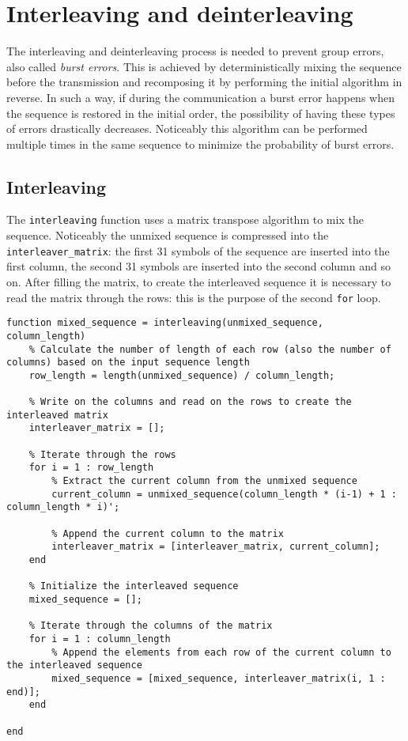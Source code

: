 \vspace{40px} \section{Interleaving and deinterleaving} \label{interleaving-process}
The interleaving and deinterleaving process is needed to prevent group errors, also called \textsl{burst errors}. This is achieved by deterministically mixing the sequence before the transmission and recomposing it by performing the initial algorithm in reverse. In such a way, if during the communication a burst error happens when the sequence is restored in the initial order, the possibility of having these types of errors drastically decreases. Noticeably this algorithm can be performed multiple times in the same sequence to minimize the probability of burst errors.


\subsection{Interleaving}\label{interleaving}
The \texttt{interleaving} function uses a matrix transpose algorithm to mix the sequence. Noticeably the unmixed sequence is compressed into the \texttt{interleaver\_matrix}: the first 31 symbols of the sequence are inserted into the first column, the second 31 symbols are inserted into the second column and so on. After filling the matrix, to create the interleaved sequence it is necessary to read the matrix through the rows: this is the purpose of the second \texttt{for} loop.

\begin{lstlisting}
function mixed_sequence = interleaving(unmixed_sequence, column_length)
    % Calculate the number of length of each row (also the number of columns) based on the input sequence length
    row_length = length(unmixed_sequence) / column_length;

    % Write on the columns and read on the rows to create the interleaved matrix
    interleaver_matrix = [];

    % Iterate through the rows
    for i = 1 : row_length
        % Extract the current column from the unmixed sequence
        current_column = unmixed_sequence(column_length * (i-1) + 1 : column_length * i)';
        
        % Append the current column to the matrix
        interleaver_matrix = [interleaver_matrix, current_column];
    end
    
    % Initialize the interleaved sequence
    mixed_sequence = [];

    % Iterate through the columns of the matrix
    for i = 1 : column_length
        % Append the elements from each row of the current column to the interleaved sequence
        mixed_sequence = [mixed_sequence, interleaver_matrix(i, 1 : end)];
    end

end
\end{lstlisting}

